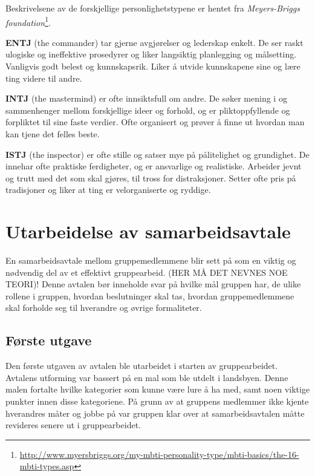 Beskrivelsene av de forskjellige personlighetstypene er hentet fra \textit{Meyers-Briggs foundation}\footnote{\url{http://www.myersbriggs.org/my-mbti-personality-type/mbti-basics/the-16-mbti-types.asp}}.
\vspace{\secspace}

\textbf{ENTJ} (the commander) tar gjerne avgjørelser og lederskap enkelt. 
De ser raskt ulogiske og ineffektive prosedyrer og liker langsiktig planlegging og målsetting. 
Vanligvis godt belest og kunnskapsrik. 
Liker å utvide kunnskapene sine og lære ting videre til andre. 
\vspace{\secspace}

\textbf{INTJ} (the mastermind) er ofte innsiktsfull om andre. 
De søker mening i og sammenhenger mellom forskjellige ideer og forhold, og er pliktoppfyllende og forpliktet til sine faste verdier. 
Ofte organisert og prøver å finne ut hvordan man kan tjene det felles beste. 

\textbf{ISTJ} (the inspector) er ofte stille og satser mye på pålitelighet og grundighet. 
De innehar ofte praktiske ferdigheter, og er ansvarlige og realistiske. 
Arbeider jevnt og trutt med det som skal gjøres, til tross for distraksjoner. 
Setter ofte pris på tradisjoner og liker at ting er velorganiserte og ryddige. 

\section{Utarbeidelse av samarbeidsavtale}
En samarbeidsavtale mellom gruppemedlemmene blir sett på som en viktig og nødvendig del av et effektivt gruppearbeid. 
(HER MÅ DET NEVNES NOE TEORI)!
Denne avtalen bør inneholde svar på hvilke mål gruppen har, de ulike rollene i gruppen, hvordan beslutninger skal tas, hvordan gruppemedlemmene skal forholde seg til hverandre og øvrige formaliteter. 

\subsection{Første utgave}
Den første utgaven av avtalen ble utarbeidet i starten av gruppearbeidet. 
Avtalens utforming var bassert på en mal som ble utdelt i landsbyen. 
Denne malen fortalte hvilke kategorier som kunne være lure å ha med, samt noen viktige punkter innen disse kategoriene. 
På grunn av at gruppens medlemmer ikke kjente hverandres måter og jobbe på var gruppen klar over at samarbeidsavtalen måtte revideres senere ut i gruppearbeidet. 
\vspace{\secspace}

